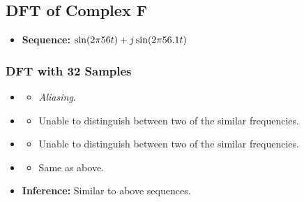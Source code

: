 \documentclass[../../course]{subfiles}
\begin{document}
\pagebreak

\subsection{DFT of Complex F} \label{ssec:dtftCplxF}

\begin{itemize} [label=]

    \item \textbf{Sequence:} $\sin(2 \pi 56 t) + j \sin(2 \pi 56.1 t)$

\end{itemize}

\subsubsection{DFT with 32 Samples}

\begin{itemize} [label=]

    \item \sampFreqMuchLess
        \begin{itemize} [label=]
            \item \emph{Aliasing}.
        \end{itemize}

    \item \sampFreqNorm
        \begin{itemize} [label=]
            \item Unable to distinguish between two of the similar frequencies.
        \end{itemize}

    \item \sampFreqSligGreat
        \begin{itemize} [label=]
            \item Unable to distinguish between two of the similar frequencies.
        \end{itemize}

    \item \sampFreqMuchGreat
        \begin{itemize} [label=]
            \item Same as above.
        \end{itemize}

    \item \textbf{Inference:} Similar to above sequences.

\end{itemize}
\end{document}
